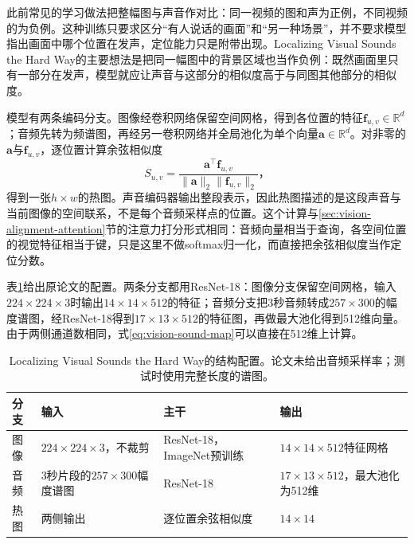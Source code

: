 此前常见的学习做法把整幅图与声音作对比：同一视频的图和声为正例，不同视频的为负例。这种训练只要求区分“有人说话的画面”和“另一种场景”，并不要求模型指出画面中哪个位置在发声，定位能力只是附带出现。Localizing Visual Sounds the Hard Way的主要想法是把同一幅图中的背景区域也当作负例：既然画面里只有一部分在发声，模型就应让声音与这部分的相似度高于与同图其他部分的相似度。

模型有两条编码分支。图像经卷积网络保留空间网格，得到各位置的特征$\bm f_{u,v}\in\mathbb R^d$；音频先转为频谱图，再经另一卷积网络并全局池化为单个向量$\bm a\in\mathbb R^d$。对非零的$\bm a$与$\bm f_{u,v}$，逐位置计算余弦相似度
\begin{equation}
  S_{u,v}=\frac{\bm a^\top\bm f_{u,v}}
                 {\lVert\bm a\rVert_2\lVert\bm f_{u,v}\rVert_2}\text{，}
  \label{eq:vision-sound-map}
\end{equation}
得到一张$h\times w$的热图。声音编码器输出整段表示，因此热图描述的是这段声音与当前图像的空间联系，不是每个音频采样点的位置。这个计算与\ref{sec:vision-alignment-attention}节的注意力打分形式相同：音频向量相当于查询，各空间位置的视觉特征相当于键，只是这里不做softmax归一化，而直接把余弦相似度当作定位分数。

表\ref{tab:vision-understanding-lvs-config}给出原论文的配置。两条分支都用ResNet-18：图像分支保留空间网格，输入$224\times224\times3$时输出$14\times14\times512$的特征；音频分支把3秒音频转成$257\times300$的幅度谱图，经ResNet-18得到$17\times13\times512$的特征图，再做最大池化得到512维向量。由于两侧通道数相同，式\eqref{eq:vision-sound-map}可以直接在512维上计算。

\begin{table}[htbp]
  \centering
  \small
  \begin{tabularx}{\linewidth}{@{}p{14mm}XXX@{}}
    \toprule
    分支 & 输入 & 主干 & 输出\\
    \midrule
    图像 & $224\times224\times3$，不裁剪 & ResNet-18，ImageNet预训练 & $14\times14\times512$特征网格\\
    音频 & 3秒片段的$257\times300$幅度谱图 & ResNet-18 & $17\times13\times512$，最大池化为512维\\
    热图 & 两侧输出 & 逐位置余弦相似度 & $14\times14$\\
    \bottomrule
  \end{tabularx}
  \caption{Localizing Visual Sounds the Hard Way的结构配置。论文未给出音频采样率；测试时使用完整长度的谱图。}
  \label{tab:vision-understanding-lvs-config}
\end{table}

